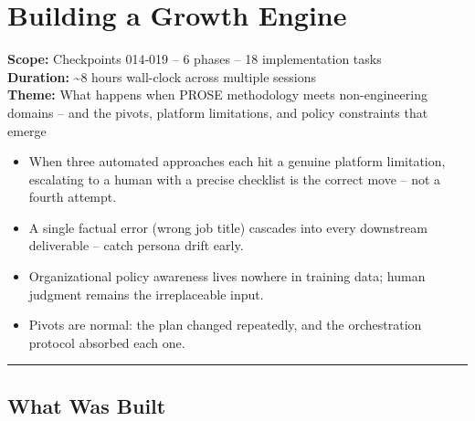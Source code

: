 \documentclass[
  a4paper,
  DIV=11,
  numbers=noendperiod]{scrreprt}
\providecommand{\tightlist}{%
  \setlength{\itemsep}{0pt}\setlength{\parskip}{0pt}}
\begin{document}
\chapter{Building a Growth Engine}\label{building-a-growth-engine}

\textbf{Scope:} Checkpoints 014-019 -- 6 phases -- 18 implementation
tasks\\
\textbf{Duration:} \textasciitilde8 hours wall-clock across multiple
sessions\\
\textbf{Theme:} What happens when PROSE methodology meets
non-engineering domains -- and the pivots, platform limitations, and
policy constraints that emerge

\begin{tcolorbox}[enhanced jigsaw, arc=.35mm, bottomrule=.15mm, bottomtitle=1mm, breakable, colback=white, colbacktitle=quarto-callout-tip-color!10!white, colframe=quarto-callout-tip-color-frame, coltitle=black, left=2mm, leftrule=.75mm, opacityback=0, opacitybacktitle=0.6, rightrule=.15mm, title=\textcolor{quarto-callout-tip-color}{\faLightbulb}\hspace{0.5em}{Key Takeaways}, titlerule=0mm, toprule=.15mm, toptitle=1mm]

\begin{itemize}
\tightlist
\item
  When three automated approaches each hit a genuine platform
  limitation, escalating to a human with a precise checklist is the
  correct move -- not a fourth attempt.
\item
  A single factual error (wrong job title) cascades into every
  downstream deliverable -- catch persona drift early.
\item
  Organizational policy awareness lives nowhere in training data; human
  judgment remains the irreplaceable input.
\item
  Pivots are normal: the plan changed repeatedly, and the orchestration
  protocol absorbed each one.
\end{itemize}

\end{tcolorbox}

\begin{center}\rule{0.5\linewidth}{0.5pt}\end{center}

\section{What Was Built}\label{what-was-built}
\end{document}
